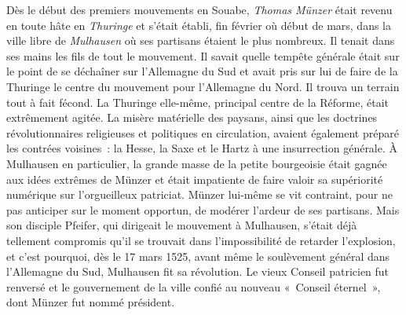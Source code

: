 \documentclass[french,twoside]{book} %
\newcommand\chaptercont{} %
\begin{document}
\chaptercont
\noindent Dès le début des premiers mouvements en Souabe, \emph{Thomas Münzer} était revenu en toute hâte en \emph{Thuringe} et s’était établi, fin février où début de mars, dans la ville libre de \emph{Mulhausen} où ses partisans étaient le plus nombreux. Il tenait dans ses mains les fils de tout le mouvement. Il savait quelle tempête générale était sur le point de se déchaîner sur l’Allemagne du Sud et avait pris sur lui de faire de la Thuringe le centre du mouvement pour l’Allemagne du Nord. Il trouva un terrain tout à fait fécond. La Thuringe elle-même, principal centre de la Réforme, était extrêmement agitée. La misère matérielle des paysans, ainsi que les doctrines révolutionnaires religieuses et politiques en circulation, avaient également préparé les contrées voisines : la Hesse, la Saxe et le Hartz à une insurrection générale. À Mulhausen en particulier, la grande masse de la petite bourgeoisie était gagnée aux idées extrêmes de Münzer et était impatiente de faire valoir sa supériorité numérique sur l’orgueilleux patriciat. Münzer lui-même se vit contraint, pour ne pas anticiper sur le moment opportun, de modérer l’ardeur de ses partisans. Mais son disciple Pfeifer, qui dirigeait le mouvement à Mulhausen, s’était déjà tellement compromis qu’il se trouvait dans l’impossibilité de retarder l’explosion, et c’est pourquoi, dès le 17 mars 1525, avant même le soulèvement général dans l’Allemagne du Sud, Mulhausen fit sa révolution. Le vieux Conseil patricien fut renversé et le gouvernement de la ville confié au nouveau « Conseil éternel », dont Münzer fut nommé président.\par
\end{document}

